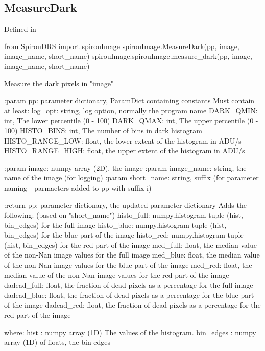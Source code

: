 \noindent\begin{minipage}{\textwidth}
\subsection{MeasureDark}

Defined in \spirouImage{}

\begin{pythonbox}
from SpirouDRS import spirouImage
spirouImage.MeasureDark(pp, image, image_name, short_name)
spirouImage.spirouImage.measure_dark(pp, image, image_name, short_name)
\end{pythonbox}

\begin{pythondocstring}
Measure the dark pixels in "image"

:param pp: parameter dictionary, ParamDict containing constants
    Must contain at least:
            log_opt: string, log option, normally the program name
            DARK_QMIN: int, The lower percentile (0 - 100)
            DARK_QMAX: int, The upper percentile (0 - 100)
            HISTO_BINS: int,  The number of bins in dark histogram
            HISTO_RANGE_LOW: float, the lower extent of the histogram
                             in ADU/s
            HISTO_RANGE_HIGH: float, the upper extent of the histogram
                              in ADU/s

:param image: numpy array (2D), the image
:param image_name: string, the name of the image (for logging)
:param short_name: string, suffix (for parameter naming -
                    parmaeters added to pp with suffix i)

:return pp: parameter dictionary, the updated parameter dictionary
        Adds the following: (based on "short_name")
            histo_full: numpy.histogram tuple (hist, bin_edges) for
                        the full image
            histo_blue: numpy.histogram tuple (hist, bin_edges) for
                        the blue part of the image
            histo_red: numpy.histogram tuple (hist, bin_edges) for
                        the red part of the image
            med_full: float, the median value of the non-Nan image values
                      for the full image
            med_blue: float, the median value of the non-Nan image values
                      for the blue part of the image
            med_red: float, the median value of the non-Nan image values
                     for the red part of the image
            dadead_full: float, the fraction of dead pixels as a percentage
                         for the full image
            dadead_blue: float, the fraction of dead pixels as a percentage
                         for the blue part of the image
            dadead_red: float, the fraction of dead pixels as a percentage
                        for the red part of the image

      where:
          hist : numpy array (1D) The values of the histogram.
          bin_edges : numpy array (1D) of floats, the bin edges
\end{pythondocstring}
\end{minipage}

